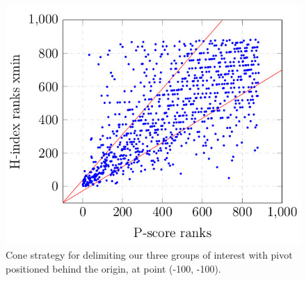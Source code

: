 \documentclass[man,floatsintext]{apa6}
\begin{document}
\begin{figure}[h!]
  \begin{center}
    \centerline{\includegraphics[scale=0.4]{pivot_strategy}}

    \caption{Cone strategy for delimiting our three groups of interest with pivot positioned behind the origin, at point (-100, -100).}
    \label{fig:cone_strategy_adapted}
  \end{center}
\end{figure}
\end{document}
